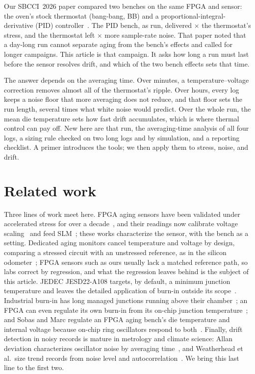 \documentclass[10pt,twocolumn]{article}
\begin{document}
Our SBCCI~2026 paper compared two benches on the same FPGA and sensor: the oven's stock thermostat (bang-bang, BB) and a proportional-integral-derivative (PID) controller~\cite{sbcci26}. The PID bench, as run, delivered \vAFratio$\times$ the thermostat's stress, and the thermostat left \vSigRawRatio$\times$ more sample-rate noise. That paper noted that a day-long run cannot separate aging from the bench's effects and called for longer campaigns. This article is that campaign. It asks how long a run must last before the sensor resolves drift, and which of the two bench effects sets that time.

The answer depends on the averaging time. Over minutes, a temperature--voltage correction removes almost all of the thermostat's ripple. Over hours, every log keeps a noise floor that more averaging does not reduce, and that floor sets the run length, several times what white noise would predict. Over the whole run, the mean die temperature sets how fast drift accumulates, which is where thermal control can pay off. New here are that run, the averaging-time analysis of all four logs, a sizing rule checked on two long logs and by simulation, and a reporting checklist. A primer introduces the tools; we then apply them to stress, noise, and drift.

\section{Related work}

Three lines of work meet here. FPGA aging sensors have been validated under accelerated stress for over a decade~\cite{valdes}, and their readings now calibrate voltage scaling~\cite{niemann} and feed SLM~\cite{kashyap}; these works characterize the sensor, with the bench as a setting. Dedicated aging monitors cancel temperature and voltage by design, comparing a stressed circuit with an unstressed reference, as in the silicon odometer~\cite{keane}; FPGA sensors such as ours usually lack a matched reference path, so labs correct by regression, and what the regression leaves behind is the subject of this article. JEDEC JESD22-A108 targets, by default, a minimum junction temperature and leaves the detailed application of burn-in outside its scope~\cite{jedec}. Industrial burn-in has long managed junctions running above their chamber~\cite{vassighi}; an FPGA can even regulate its own burn-in from its on-chip junction temperature~\cite{xilinx}; and Sobas and Marc regulate an FPGA aging bench's die temperature and internal voltage because on-chip ring oscillators respond to both~\cite{sobas}. Finally, drift detection in noisy records is mature in metrology and climate science: Allan deviation characterizes oscillator noise by averaging time~\cite{allan}, and Weatherhead et al.\ size trend records from noise level and autocorrelation~\cite{weatherhead}. We bring this last line to the first two.
\end{document}
